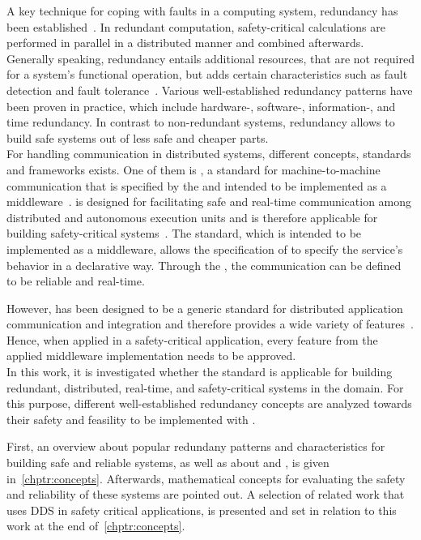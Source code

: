 A key technique for coping with faults in a computing system, redundancy has been established~\cite{TanenbaumSteen07}.
In redundant computation, safety-critical calculations are performed in parallel in a distributed manner and combined afterwards.
Generally speaking, redundancy entails additional resources, that are not required for a system's functional operation, but adds certain characteristics such as fault detection and fault tolerance~\cite{BarryFaultToleranceAnalysis}.
Various well-established redundancy patterns have been proven in practice, which include hardware-, software-, information-, and time redundancy.
In contrast to non-redundant systems, redundancy allows to build safe systems out of less safe and cheaper parts.
\\

For handling communication in distributed systems, different concepts, standards and frameworks exists.
One of them is , a  standard for machine-to-machine communication that is specified by the  and intended to be implemented as a middleware~\cite{omgDDSspec}.
 is designed for facilitating safe and real-time communication among distributed and autonomous execution units and is therefore applicable for building safety-critical systems~\cite{DistributedSafety2020}.
The standard, which is intended to be implemented as a middleware, allows the specification of  to specify the service's behavior in a declarative way.
Through the , the communication can be defined to be reliable and real-time.

However,  has been designed to be a generic standard for distributed application communication and integration and therefore provides a wide variety of features~\cite{omgDDSspec}.
Hence, when applied in a safety-critical application, every feature from the applied middleware implementation needs to be approved.
\\

In this work, it is investigated whether the  standard is applicable for building redundant, distributed, real-time, and safety-critical systems in the  domain.
For this purpose, different well-established redundancy concepts are analyzed towards their safety and feasility to be implemented with .

First, an overview about popular redundany patterns and characteristics for building safe and reliable systems, as well as about  and , is given in~\autoref{chptr:concepts}.
Afterwards, mathematical concepts for evaluating the safety and reliability of these systems are pointed out.
A selection of related work that uses \gls{DDS} in safety critical applications, is presented and set in relation to this work at the end of~\autoref{chptr:concepts}.
\\

